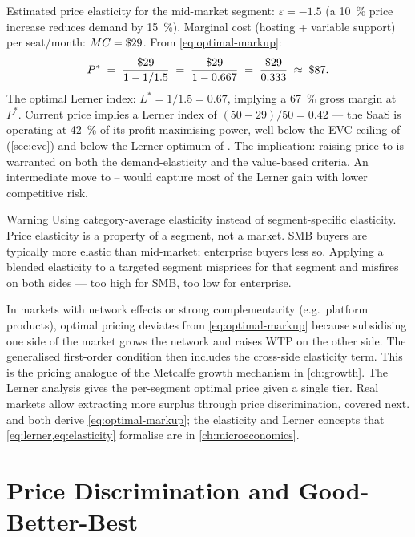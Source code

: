 \begin{example}
Estimated price elasticity for the mid-market segment: \(\varepsilon = -1.5\) (a \qty{10}{\percent} price increase reduces demand by \qty{15}{\percent}). Marginal cost (hosting + variable support) per seat/month: \(MC = \$\num{29}\). From \cref{eq:optimal-markup}:
\[
  P^* \;=\; \frac{\$\num{29}}{1 - 1/1.5} \;=\; \frac{\$\num{29}}{1 - 0.667} \;=\; \frac{\$\num{29}}{0.333} \;\approx\; \$\num{87}.
\]
The optimal Lerner index: \(L^* = 1/1.5 = 0.67\), implying a \qty{67}{\percent} gross margin at \(P^*\). Current price  implies a Lerner index of \((50-29)/50 = 0.42\) --- the SaaS is operating at \qty{42}{\percent} of its profit-maximising power, well below the EVC ceiling of  (\cref{sec:evc}) and below the Lerner optimum of . The implication: raising price to  is warranted on both the demand-elasticity and the value-based criteria. An intermediate move to -- would capture most of the Lerner gain with lower competitive risk.
\end{example}

\begin{admonition}{Warning}
Using category-average elasticity instead of segment-specific elasticity. Price elasticity is a property of a segment, not a market. SMB buyers are typically more elastic than mid-market; enterprise buyers less so. Applying a blended elasticity to a targeted segment misprices for that segment and misfires on both sides --- too high for SMB, too low for enterprise.
\end{admonition}

In markets with network effects or strong complementarity (e.g.\ platform products), optimal pricing deviates from \cref{eq:optimal-markup} because subsidising one side of the market grows the network and raises WTP on the other side. The generalised first-order condition then includes the cross-side elasticity term. This is the pricing analogue of the Metcalfe growth mechanism in \cref{ch:growth}. The Lerner analysis gives the per-segment optimal price given a single tier. Real markets allow extracting more surplus through price discrimination, covered next. \textcite{nagle2023strategy} and \textcite{pindyck2017} both derive \cref{eq:optimal-markup}; the elasticity and Lerner concepts that \cref{eq:lerner,eq:elasticity} formalise are in \cref{ch:microeconomics}.

\section{Price Discrimination and Good-Better-Best}\label{sec:price-discrimination}

